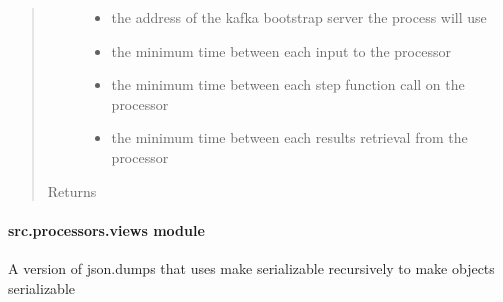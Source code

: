 \documentclass[letterpaper,10pt,english]{sphinxmanual}
\begin{document}
\begin{fulllineitems}
\begin{quote}
\begin{description}
\begin{itemize}
\item {} 
 \textendash{} the address of the kafka bootstrap server the process will use

\item {} 
 \textendash{} the minimum time between each input to the processor

\item {} 
 \textendash{} the minimum time between each step function call on the processor

\item {} 
 \textendash{} the minimum time between each results retrieval from the processor

\end{itemize}

\item[{Returns}] \leavevmode


\end{description}\end{quote}

\end{fulllineitems}



\paragraph{src.processors.views module}
\label{\detokenize{src.processors:module-src.processors.views}}\label{\detokenize{src.processors:src-processors-views-module}}

\begin{fulllineitems}
\label{\detokenize{src.processors:src.processors.views.dumps}}
A version of json.dumps that uses make serializable recursively to make objects serializable

\end{fulllineitems}
\end{document}
